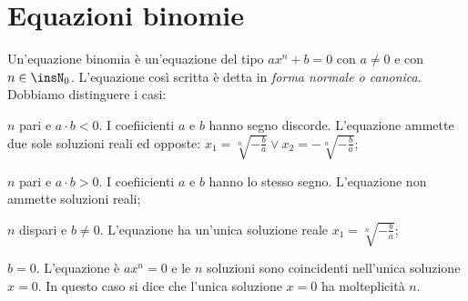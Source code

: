 \section{Equazioni binomie}
Un’equazione binomia è un’equazione del tipo $ax^n+b=0$ con $a\neq 0$ e con $n\in \insN_0$. L’equazione così scritta è detta in \emph{forma normale o canonica}.
Dobbiamo distinguere i casi:
\begin{itemize*}
\item $n$ pari e $ a\cdot b< 0 $. I coefiicienti $ a $ e $ b $ hanno segno discorde. L’equazione ammette due sole soluzioni reali ed opposte: $x_1=\sqrt[n]{-\frac b a}\vee x_2=-\sqrt[n]{-\frac b a}$;
\item $n$ pari e $ a\cdot b> 0 $. I coefiicienti $ a $ e $ b $ hanno lo stesso segno. L’equazione non ammette soluzioni reali;
\item $n$ dispari e $ b\neq 0 $. L’equazione ha un’unica soluzione reale $x_1=\sqrt[n]{-\frac b a}$;
\item $b=0$. L’equazione è $ax^n=0$ e le $n$ soluzioni sono coincidenti nell’unica soluzione $x=0$. In questo caso si dice che l’unica soluzione $x=0$ ha molteplicità $n$.
\end{itemize*}
\newpage
